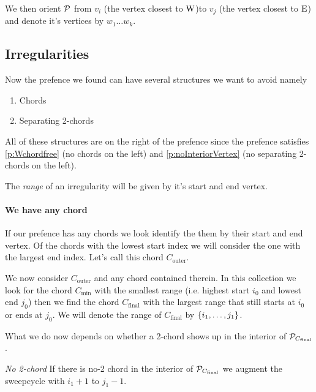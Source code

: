     We then orient $\P$ from $v_i$ (the vertex closest to $\pW$)to $v_j$ (the vertex closest to $\pE$) and denote it's vertices by $w_1 \ldots w_k$.


    \subsection{Irregularities}
      Now the prefence we found can have several structures we want to avoid
      namely
      \begin{enumerate}
        \itemsep=-4pt
        \item Chords
        \item Separating 2-chords
      \end{enumerate}

      All of these structures are on the right of the prefence since the prefence satisfies \ref{p:Wchordfree} (no chords on the left) and \ref{p:noInteriorVertex} (no separating 2-chords on the left).

      The \emph{range} of an irregularity will be given by it's start and end vertex.

      \paragraph{We have any chord}
      If our prefence has any chords we look identify the them by their start and end vertex. Of the chords with the lowest start index we will consider the one with the largest end index. Let's call this chord $C_\text{outer}$.

      We now consider $C_\text{outer}$ and any chord contained therein. In this collection we look for the chord $C_\text{min}$ with the smallest range (i.e. highest start $i_0$ and lowest end $j_0$) then we find the chord $C_\text{final}$ with the largest range that still starts at $i_0$ or ends at $j_0$. We will denote the range of $C_\text{final}$ by $\braces{i_1, \ldots, j_1}$.

      What we do now depends on whether a 2-chord shows up in the interior of $\P_{C_\text{final}}$.


      \emph{No 2-chord}
      If there is no-2 chord in the interior of $\P_{C_\text{final}}$ we augment the sweepcycle with $i_1 +1$ to $j_1 -1$.

